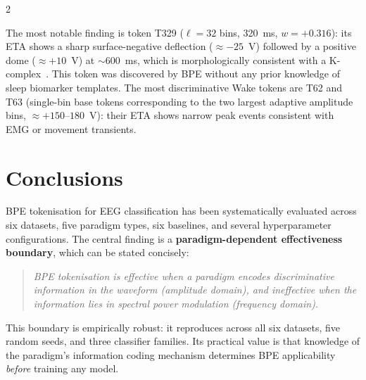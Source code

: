 \documentclass[14pt,a4paper]{extarticle}
\begin{document}
\begin{multicols}{2}

The most notable finding is token T329 ($\ell{=}32$ bins,
320~ms, $w{=}{+}0.316$): its ETA shows a sharp
surface-negative deflection
(${\approx}{-}25$~\textmu V) followed by a positive dome
(${\approx}{+}10$~\textmu V) at ${\sim}600$~ms, which is
morphologically consistent with a K-complex~\cite{berry2017aasm}.
This token was discovered by BPE without any prior knowledge
of sleep biomarker templates.
The most discriminative Wake tokens are T62 and T63
(single-bin base tokens corresponding to the two largest
adaptive amplitude bins, ${\approx}{+}150$--$180$~\textmu V):
their ETA shows narrow peak events consistent with EMG
or movement transients.

\section*{Conclusions}

BPE tokenisation for EEG classification has been systematically
evaluated across six datasets, five paradigm types, six baselines,
and several hyperparameter configurations.
The central finding is a \textbf{paradigm-dependent effectiveness
boundary}, which can be stated concisely:

\begin{quote}
\textit{BPE tokenisation is effective when a paradigm encodes
discriminative information in the waveform (amplitude domain),
and ineffective when the information lies in spectral power
modulation (frequency domain).}
\end{quote}

This boundary is empirically robust: it reproduces across all
six datasets, five random seeds, and three classifier families.
Its practical value is that knowledge of the paradigm's
information coding mechanism determines BPE applicability
\emph{before} training any model.


\end{multicols}
\end{document}
